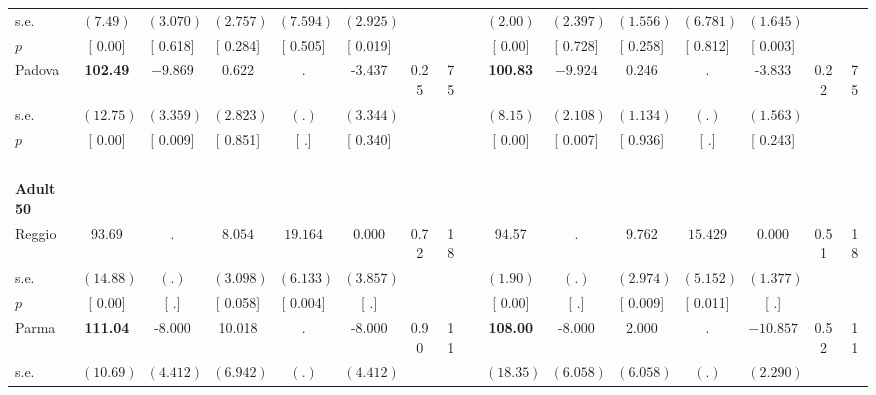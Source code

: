 \begin{longtable}{L{8em} c c c c c c c p{1em} c c c c c c c}
\quad \quad \quad \quad s.e.& $ (     7.49)$ & $ (    3.070)$ & $ (    2.757)$ & $ (    7.594)$ & $ (    2.925)$ & & & & $ (     2.00)$ & $ (    2.397)$ & $ (    1.556)$ & $ (    6.781)$ & $ (    1.645)$ & &  \\*
\quad \quad \quad \quad $ p$ & [     0.00] & [    0.618] & [    0.284] & [    0.505] & [    0.019] & & & & [     0.00] & [    0.728] & [    0.258] & [    0.812] & [    0.003] & &  \\[1em]
\quad \quad \quad Padova& \textbf{   102.49} & $ \mathbf{   -9.869}$ &     0.622 &         . &    -3.437 &      0.25 &        75 & & \textbf{   100.83} & $ \mathbf{   -9.924}$ &     0.246 &         . &    -3.833 &      0.22 &        75  \\*
\quad \quad \quad \quad s.e.& $ (    12.75)$ & $ (    3.359)$ & $ (    2.823)$ & $ (        .)$ & $ (    3.344)$ & & & & $ (     8.15)$ & $ (    2.108)$ & $ (    1.134)$ & $ (        .)$ & $ (    1.563)$ & &  \\*
\quad \quad \quad \quad $ p$ & [     0.00] & [    0.009] & [    0.851] & [        .] & [    0.340] & & & & [     0.00] & [    0.007] & [    0.936] & [        .] & [    0.243] & &  \\[1em]
~\\[1em]
\quad \quad \textbf{Adult 50} & & & & & & & & & & & & & & & \\* 
\quad \quad \quad Reggio& 93.69 &         . & $ \mathbf{    8.054}$ & $ \mathbf{   19.164}$ &     0.000 &      0.72 &        18 & & 94.57 &         . & $ \mathbf{    9.762}$ & $ \mathbf{   15.429}$ &     0.000 &      0.51 &        18  \\*
\quad \quad \quad \quad s.e.& $ (    14.88)$ & $ (        .)$ & $ (    3.098)$ & $ (    6.133)$ & $ (    3.857)$ & & & & $ (     1.90)$ & $ (        .)$ & $ (    2.974)$ & $ (    5.152)$ & $ (    1.377)$ & &  \\*
\quad \quad \quad \quad $ p$ & [     0.00] & [        .] & [    0.058] & [    0.004] & [        .] & & & & [     0.00] & [        .] & [    0.009] & [    0.011] & [        .] & &  \\[1em]
\quad \quad \quad Parma& \textbf{   111.04} &    -8.000 &    10.018 &         . &    -8.000 &      0.90 &        11 & & \textbf{   108.00} &    -8.000 &     2.000 &         . & $ \mathbf{  -10.857}$ &      0.52 &        11  \\*
\quad \quad \quad \quad s.e.& $ (    10.69)$ & $ (    4.412)$ & $ (    6.942)$ & $ (        .)$ & $ (    4.412)$ & & & & $ (    18.35)$ & $ (    6.058)$ & $ (    6.058)$ & $ (        .)$ & $ (    2.290)$ & &  \\*

\end{longtable}
